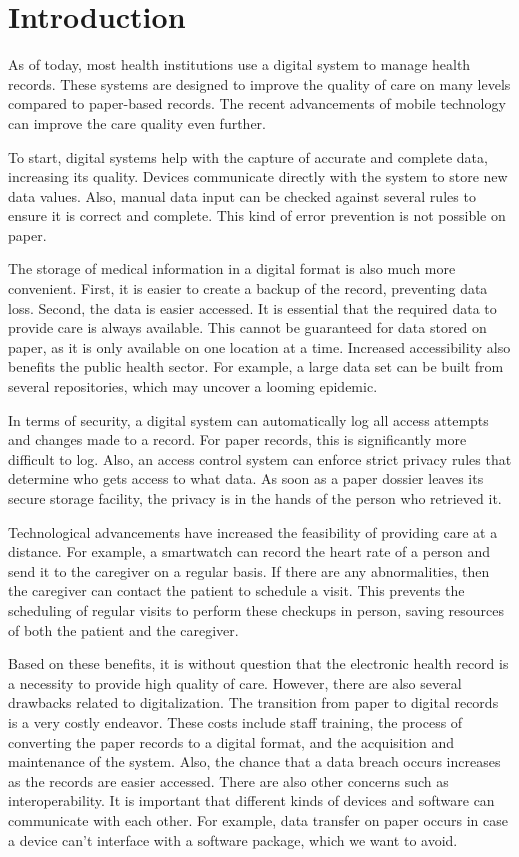 \section{Introduction}

As of today, most health institutions use a digital system to manage health records. These systems are designed to improve the quality of care on many levels compared to paper-based records. The recent advancements of mobile technology can improve the care quality even further.

To start, digital systems help with the capture of accurate and complete data, increasing its quality. Devices communicate directly with the system to store new data values. Also, manual data input can be checked against several rules to ensure it is correct and complete. This kind of error prevention is not possible on paper.

The storage of medical information in a digital format is also much more convenient. First, it is easier to create a backup of the record, preventing data loss. Second, the data is easier accessed. It is essential that the required data to provide care is always available. This cannot be guaranteed for data stored on paper, as it is only available on one location at a time. Increased accessibility also benefits the public health sector. For example, a large data set can be built from several repositories, which may uncover a looming epidemic.

In terms of security, a digital system can automatically log all access attempts and changes made to a record. For paper records, this is significantly more difficult to log. Also, an access control system can enforce strict privacy rules that determine who gets access to what data. As soon as a paper dossier leaves its secure storage facility, the privacy is in the hands of the person who retrieved it.

Technological advancements have increased the feasibility of providing care at a distance. For example, a smartwatch can record the heart rate of a person and send it to the caregiver on a regular basis. If there are any abnormalities, then the caregiver can contact the patient to schedule a visit. This prevents the scheduling of regular visits to perform these checkups in person, saving resources of both the patient and the caregiver.

Based on these benefits, it is without question that the electronic health record is a necessity to provide high quality of care. However, there are also several drawbacks related to digitalization. The transition from paper to digital records is a very costly endeavor. These costs include staff training, the process of converting the paper records to a digital format, and the acquisition and maintenance of the system. Also, the chance that a data breach occurs increases as the records are easier accessed. There are also other concerns such as interoperability. It is important that different kinds of devices and software can communicate with each other. For example, data transfer on paper occurs in case a device can't interface with a software package, which we want to avoid.

